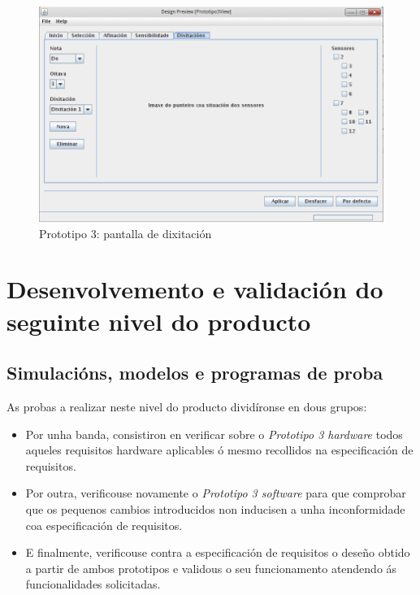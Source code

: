   \begin{figure}[htbp]
   \centering
   \includegraphics[scale=0.6,keepaspectratio=true]{./imagenes/prototipo3-5.png}
   \caption{Prototipo 3: pantalla de dixitación}
   \label{figura:Prototipo3Dixitacion}
  \end{figure}

\section{Desenvolvemento e validación do seguinte nivel do producto}

 \subsection{Simulacións, modelos e programas de proba}

 As probas a realizar neste nivel do producto dividíronse en dous grupos:

 \begin{itemize}
  \item Por unha banda, consistiron en verificar sobre o
        \textit{Prototipo 3 hardware} todos aqueles requisitos hardware
        aplicables ó mesmo recollidos na especificación de requisitos.
  \item Por outra, verificouse novamente o \textit{Prototipo 3 software} para
        que comprobar que os pequenos cambios introducidos non inducisen a unha
        inconformidade coa especificación de requisitos.
  \item E finalmente, verificouse contra a especificación de requisitos o
        deseño obtido a partir de ambos prototipos e validous o seu
        funcionamento atendendo ás funcionalidades solicitadas.
 \end{itemize}

